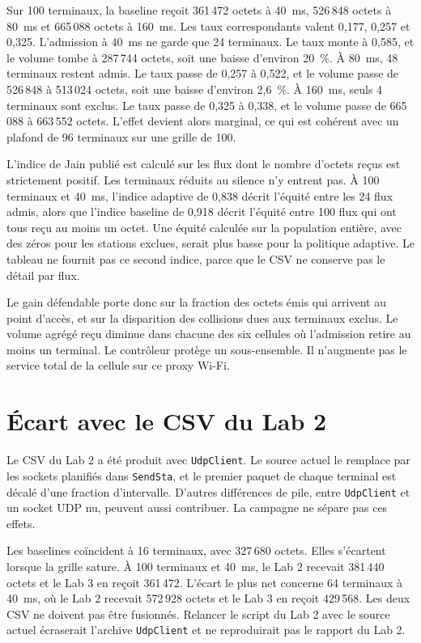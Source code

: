 \documentclass[11pt,a4paper]{article}
\begin{document}
Sur 100 terminaux, la baseline reçoit 361\,472 octets à 40~ms, 526\,848 octets à 80~ms et 665\,088 octets à 160~ms. Les taux correspondants valent 0,177, 0,257 et 0,325. L'admission à 40~ms ne garde que 24 terminaux. Le taux monte à 0,585, et le volume tombe à 287\,744 octets, soit une baisse d'environ 20~\%. À 80~ms, 48 terminaux restent admis. Le taux passe de 0,257 à 0,522, et le volume passe de 526\,848 à 513\,024 octets, soit une baisse d'environ 2,6~\%. À 160~ms, seuls 4 terminaux sont exclus. Le taux passe de 0,325 à 0,338, et le volume passe de 665\,088 à 663\,552 octets. L'effet devient alors marginal, ce qui est cohérent avec un plafond de 96 terminaux sur une grille de 100.

L'indice de Jain publié est calculé sur les flux dont le nombre d'octets reçus est strictement positif. Les terminaux réduits au silence n'y entrent pas. À 100 terminaux et 40~ms, l'indice adaptive de 0,838 décrit l'équité entre les 24 flux admis, alors que l'indice baseline de 0,918 décrit l'équité entre 100 flux qui ont tous reçu au moins un octet. Une équité calculée sur la population entière, avec des zéros pour les stations exclues, serait plus basse pour la politique adaptive. Le tableau ne fournit pas ce second indice, parce que le CSV ne conserve pas le détail par flux.

Le gain défendable porte donc sur la fraction des octets émis qui arrivent au point d'accès, et sur la disparition des collisions dues aux terminaux exclus. Le volume agrégé reçu diminue dans chacune des six cellules où l'admission retire au moins un terminal. Le contrôleur protège un sous-ensemble. Il n'augmente pas le service total de la cellule sur ce proxy Wi-Fi.

\section{Écart avec le CSV du Lab 2}

Le CSV du Lab 2 a été produit avec \texttt{UdpClient}. Le source actuel le remplace par les sockets planifiés dans \texttt{SendSta}, et le premier paquet de chaque terminal est décalé d'une fraction d'intervalle. D'autres différences de pile, entre \texttt{UdpClient} et un socket UDP nu, peuvent aussi contribuer. La campagne ne sépare pas ces effets.

Les baselines coïncident à 16 terminaux, avec 327\,680 octets. Elles s'écartent lorsque la grille sature. À 100 terminaux et 40~ms, le Lab 2 recevait 381\,440 octets et le Lab 3 en reçoit 361\,472. L'écart le plus net concerne 64 terminaux à 40~ms, où le Lab 2 recevait 572\,928 octets et le Lab 3 en reçoit 429\,568. Les deux CSV ne doivent pas être fusionnés. Relancer le script du Lab 2 avec le source actuel écraserait l'archive \texttt{UdpClient} et ne reproduirait pas le rapport du Lab 2.
\end{document}
